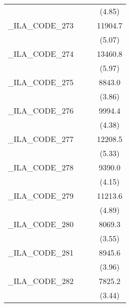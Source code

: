 {\begin{tabular}{l*{3}{c}}
            &                     &                     &      (4.85)         \\
[1em]
\_ILA\_CODE\_273&                     &                     &     11904.7\sym{***}\\
            &                     &                     &      (5.07)         \\
[1em]
\_ILA\_CODE\_274&                     &                     &     13460.8\sym{***}\\
            &                     &                     &      (5.97)         \\
[1em]
\_ILA\_CODE\_275&                     &                     &      8843.0\sym{***}\\
            &                     &                     &      (3.86)         \\
[1em]
\_ILA\_CODE\_276&                     &                     &      9994.4\sym{***}\\
            &                     &                     &      (4.38)         \\
[1em]
\_ILA\_CODE\_277&                     &                     &     12208.5\sym{***}\\
            &                     &                     &      (5.33)         \\
[1em]
\_ILA\_CODE\_278&                     &                     &      9390.0\sym{***}\\
            &                     &                     &      (4.15)         \\
[1em]
\_ILA\_CODE\_279&                     &                     &     11213.6\sym{***}\\
            &                     &                     &      (4.89)         \\
[1em]
\_ILA\_CODE\_280&                     &                     &      8069.3\sym{***}\\
            &                     &                     &      (3.55)         \\
[1em]
\_ILA\_CODE\_281&                     &                     &      8945.6\sym{***}\\
            &                     &                     &      (3.96)         \\
[1em]
\_ILA\_CODE\_282&                     &                     &      7825.2\sym{***}\\
            &                     &                     &      (3.44)         \\

\end{tabular}}
